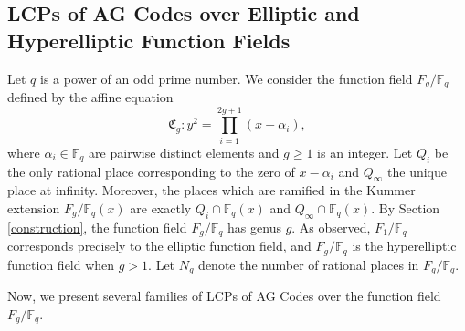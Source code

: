 \documentclass[journal,12pt,onecolumn]{IEEEtran}
\begin{document}
\subsection{LCPs of AG Codes over Elliptic and Hyperelliptic Function Fields}

Let $q$ is a power of an odd prime number. We consider the function field $F_g/\mathbb{F}_q$ defined by the affine equation
\begin{equation}\label{hyperelliptic_g}
    \mathfrak{C}_g: y^2 = \prod_{i=1}^{2g+1}(x-\alpha_i),
\end{equation}
where $\alpha_i\in\mathbb{F}_q$ are pairwise distinct elements and $g\ge1$ is an integer. Let $Q_i$ be the only rational place corresponding to the zero of $x-\alpha_i$ and $Q_\infty$ the unique place at infinity. Moreover, the places which are ramified in the Kummer extension $F_g/\mathbb{F}_q(x)$ are exactly $Q_i\cap\mathbb{F}_q(x)$ and $Q_\infty\cap\mathbb{F}_q(x)$. By Section \ref{construction}, the function field $F_g/\mathbb{F}_q$ has genus $g$. As observed, $F_1/\mathbb{F}_q$ corresponds precisely to the elliptic function field, and $F_g/\mathbb{F}_q$ is the hyperelliptic function field when $g>1$. Let $N_g$ denote the number of rational places in $F_g/\mathbb{F}_q$. 

Now, we present several families of LCPs of AG Codes over the function field $F_g/\mathbb{F}_q$. 
\end{document}
